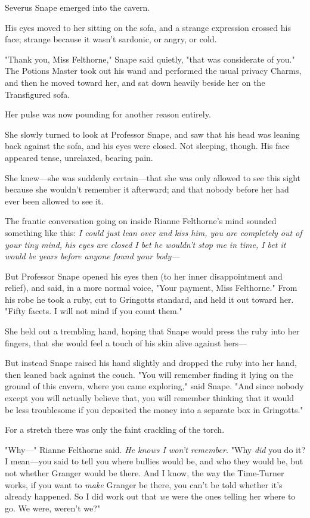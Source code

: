 Severus Snape emerged into the cavern.

His eyes moved to her sitting on the sofa, and a strange expression crossed his
face; strange because it wasn't sardonic, or angry, or cold.

"Thank you, Miss Felthorne," Snape said quietly, "that was considerate of you."
The Potions Master took out his wand and performed the usual privacy Charms,
and then he moved toward her, and sat down heavily beside her on the
Transfigured sofa.

Her pulse was now pounding for another reason entirely.

She slowly turned to look at Professor Snape, and saw that his head was leaning
back against the sofa, and his eyes were closed. Not sleeping, though. His face
appeared tense, unrelaxed, bearing pain.

She knew---she was suddenly certain---that she was only allowed to see this
sight because she wouldn't remember it afterward; and that nobody before her
had ever been allowed to see it.

The frantic conversation going on inside Rianne Felthorne's mind sounded
something like this: \emph{I could just lean over and kiss him, you are
completely out of your tiny mind, his eyes are closed I bet he wouldn't stop me
in time, I bet it would be years before anyone found your body---}

But Professor Snape opened his eyes then (to her inner disappointment and
relief), and said, in a more normal voice, "Your payment, Miss Felthorne." From
his robe he took a ruby, cut to Gringotts standard, and held it out toward her.
"Fifty facets. I will not mind if you count them."

She held out a trembling hand, hoping that Snape would press the ruby into her
fingers, that she would feel a touch of his skin alive against hers---

But instead Snape raised his hand slightly and dropped the ruby into her hand,
then leaned back against the couch. "You will remember finding it lying on the
ground of this cavern, where you came exploring," said Snape. "And since nobody
except you will actually believe that, you will remember thinking that it would
be less troublesome if you deposited the money into a separate box in
Gringotts."

For a stretch there was only the faint crackling of the torch.

"Why\mbox{---}" Rianne Felthorne said. \emph{He knows I won't remember.} "Why
\emph{did} you do it? I mean---you said to tell you where bullies would be, and
who they would be, but not whether Granger would be there. And I know, the way
the Time-Turner works, if you want to \emph{make} Granger be there, you can't
be told whether it's already happened. So I did work out that \emph{we} were
the ones telling her where to go. We were, weren't we?"

